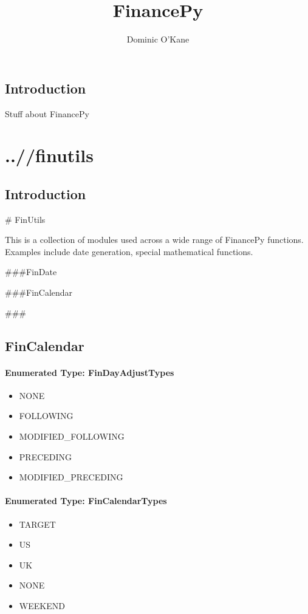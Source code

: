 \documentclass[twoside,11pt]{book}
\begin{document}
\title{{\Huge \bf FinancePy}}
\author{Dominic O'Kane}

\maketitle 

\cleardoublepage

\setcounter{tocdepth}{1}
\tableofcontents

\setcounter{page}{1}

\section{Introduction}
Stuff about FinancePy
\chapter{..//finutils}
\section{Introduction}
# FinUtils

This is a collection of modules used across a wide range of FinancePy functions. Examples include date generation, special mathematical functions.

###FinDate

###FinCalendar

###
\newpage
\section{FinCalendar}

\subsubsection{Enumerated Type: FinDayAdjustTypes}
\begin{itemize}
\item{NONE}
\item{FOLLOWING}
\item{MODIFIED\_FOLLOWING}
\item{PRECEDING}
\item{MODIFIED\_PRECEDING}
\end{itemize}

\subsubsection{Enumerated Type: FinCalendarTypes}
\begin{itemize}
\item{TARGET}
\item{US}
\item{UK}
\item{NONE}
\item{WEEKEND}
\end{itemize}
\end{document}
